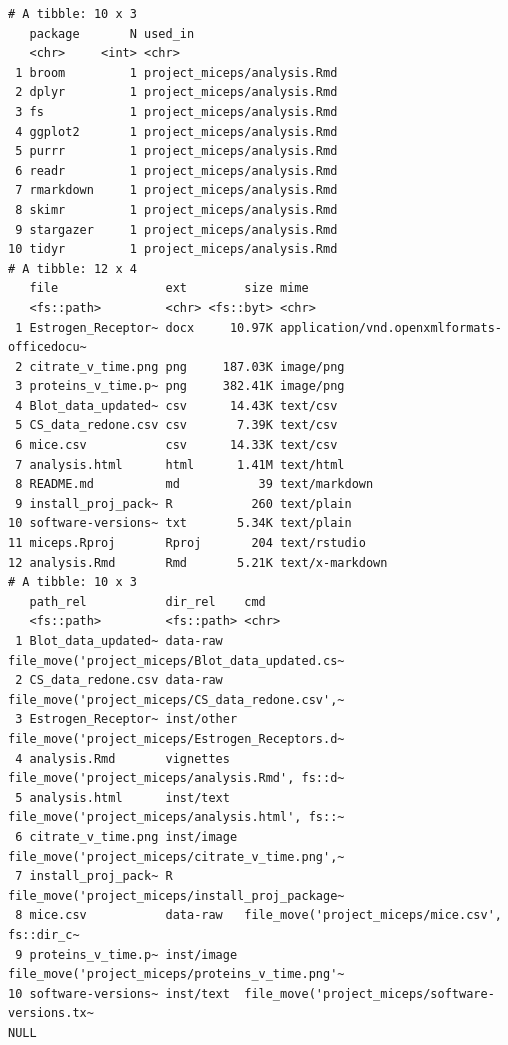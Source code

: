 \documentclass[12pt,twoside]{reedthesis}
\begin{document}
\begin{verbatim}
# A tibble: 10 x 3
   package       N used_in                    
   <chr>     <int> <chr>                      
 1 broom         1 project_miceps/analysis.Rmd
 2 dplyr         1 project_miceps/analysis.Rmd
 3 fs            1 project_miceps/analysis.Rmd
 4 ggplot2       1 project_miceps/analysis.Rmd
 5 purrr         1 project_miceps/analysis.Rmd
 6 readr         1 project_miceps/analysis.Rmd
 7 rmarkdown     1 project_miceps/analysis.Rmd
 8 skimr         1 project_miceps/analysis.Rmd
 9 stargazer     1 project_miceps/analysis.Rmd
10 tidyr         1 project_miceps/analysis.Rmd
# A tibble: 12 x 4
   file               ext        size mime                                      
   <fs::path>         <chr> <fs::byt> <chr>                                     
 1 Estrogen_Receptor~ docx     10.97K application/vnd.openxmlformats-officedocu~
 2 citrate_v_time.png png     187.03K image/png                                 
 3 proteins_v_time.p~ png     382.41K image/png                                 
 4 Blot_data_updated~ csv      14.43K text/csv                                  
 5 CS_data_redone.csv csv       7.39K text/csv                                  
 6 mice.csv           csv      14.33K text/csv                                  
 7 analysis.html      html      1.41M text/html                                 
 8 README.md          md           39 text/markdown                             
 9 install_proj_pack~ R           260 text/plain                                
10 software-versions~ txt       5.34K text/plain                                
11 miceps.Rproj       Rproj       204 text/rstudio                              
12 analysis.Rmd       Rmd       5.21K text/x-markdown                           
# A tibble: 10 x 3
   path_rel           dir_rel    cmd                                            
   <fs::path>         <fs::path> <chr>                                          
 1 Blot_data_updated~ data-raw   file_move('project_miceps/Blot_data_updated.cs~
 2 CS_data_redone.csv data-raw   file_move('project_miceps/CS_data_redone.csv',~
 3 Estrogen_Receptor~ inst/other file_move('project_miceps/Estrogen_Receptors.d~
 4 analysis.Rmd       vignettes  file_move('project_miceps/analysis.Rmd', fs::d~
 5 analysis.html      inst/text  file_move('project_miceps/analysis.html', fs::~
 6 citrate_v_time.png inst/image file_move('project_miceps/citrate_v_time.png',~
 7 install_proj_pack~ R          file_move('project_miceps/install_proj_package~
 8 mice.csv           data-raw   file_move('project_miceps/mice.csv', fs::dir_c~
 9 proteins_v_time.p~ inst/image file_move('project_miceps/proteins_v_time.png'~
10 software-versions~ inst/text  file_move('project_miceps/software-versions.tx~
NULL
\end{verbatim}
\normalsize
\end{document}
